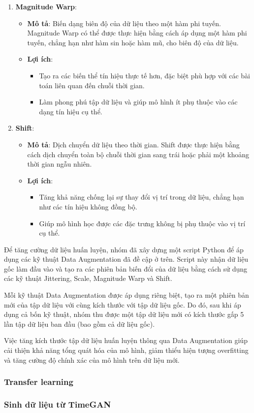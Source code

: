 \begin{enumerate}
\item \textbf{Magnitude Warp}: 
\begin{itemize}
\item \textbf{Mô tả}: Biến dạng biên độ của dữ liệu theo một hàm phi tuyến. Magnitude Warp có thể được thực hiện bằng cách áp dụng một hàm phi tuyến, chẳng hạn như hàm sin hoặc hàm mũ, cho biên độ của dữ liệu.
\item \textbf{Lợi ích}:
\begin{itemize}
\item Tạo ra các biến thể tín hiệu thực tế hơn, đặc biệt phù hợp với các bài toán liên quan đến chuỗi thời gian.
\item Làm phong phú tập dữ liệu và giúp mô hình ít phụ thuộc vào các dạng tín hiệu cụ thể.
 \end{itemize}
\end{itemize}

\item \textbf{Shift}: 
 \begin{itemize}
 \item \textbf{Mô tả}: Dịch chuyển dữ liệu theo thời gian. Shift được thực hiện bằng cách dịch chuyển toàn bộ chuỗi thời gian sang trái hoặc phải một khoảng thời gian ngẫu nhiên.
 \item \textbf{Lợi ích}:
\begin{itemize}
\item Tăng khả năng chống lại sự thay đổi vị trí trong dữ liệu, chẳng hạn như các tín hiệu không đồng bộ.
\item Giúp mô hình học được các đặc trưng không bị phụ thuộc vào vị trí cụ thể.
\end{itemize}
\end{itemize}

\end{enumerate}

Để tăng cường dữ liệu huấn luyện, nhóm đã xây dựng một script Python để áp dụng các kỹ thuật Data Augmentation đã đề cập ở trên. Script này nhận dữ liệu gốc làm đầu vào và tạo ra các phiên bản biến đổi của dữ liệu bằng cách sử dụng các kỹ thuật Jittering, Scale, Magnitude Warp và Shift.

Mỗi kỹ thuật Data Augmentation được áp dụng riêng biệt, tạo ra một phiên bản mới của tập dữ liệu với cùng kích thước với tập dữ liệu gốc. Do đó, sau khi áp dụng cả bốn kỹ thuật, nhóm thu được một tập dữ liệu mới có kích thước gấp 5 lần tập dữ liệu ban đầu (bao gồm cả dữ liệu gốc). 

Việc tăng kích thước tập dữ liệu huấn luyện thông qua Data Augmentation giúp cải thiện khả năng tổng quát hóa của mô hình, giảm thiểu hiện tượng overfitting và tăng cường độ chính xác của mô hình trên dữ liệu mới.
\subsubsection{Transfer learning}
\subsubsection{Sinh dữ liệu từ TimeGAN}
